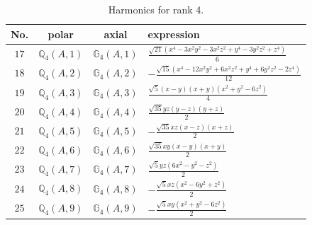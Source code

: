 \documentclass[fleqn,8pt,landscape]{jsarticle}
\begin{document}
\begin{table}[ht!]
\begin{center}
\caption{Harmonics for rank 4.}
\renewcommand{\arraystretch}{1.3}
\begin{tabular}{cccl} \hline \hline
No. & polar & axial & expression \\ \hline
$ 17 $ & $ \mathbb{Q}_{4}(A,1) $ & $ \mathbb{G}_{4}(A,1) $ & $ \frac{\sqrt{21} \left(x^{4} - 3 x^{2} y^{2} - 3 x^{2} z^{2} + y^{4} - 3 y^{2} z^{2} + z^{4}\right)}{6} $ \\
$ 18 $ & $ \mathbb{Q}_{4}(A,2) $ & $ \mathbb{G}_{4}(A,2) $ & $ - \frac{\sqrt{15} \left(x^{4} - 12 x^{2} y^{2} + 6 x^{2} z^{2} + y^{4} + 6 y^{2} z^{2} - 2 z^{4}\right)}{12} $ \\
$ 19 $ & $ \mathbb{Q}_{4}(A,3) $ & $ \mathbb{G}_{4}(A,3) $ & $ \frac{\sqrt{5} \left(x - y\right) \left(x + y\right) \left(x^{2} + y^{2} - 6 z^{2}\right)}{4} $ \\
$ 20 $ & $ \mathbb{Q}_{4}(A,4) $ & $ \mathbb{G}_{4}(A,4) $ & $ \frac{\sqrt{35} y z \left(y - z\right) \left(y + z\right)}{2} $ \\
$ 21 $ & $ \mathbb{Q}_{4}(A,5) $ & $ \mathbb{G}_{4}(A,5) $ & $ - \frac{\sqrt{35} x z \left(x - z\right) \left(x + z\right)}{2} $ \\
$ 22 $ & $ \mathbb{Q}_{4}(A,6) $ & $ \mathbb{G}_{4}(A,6) $ & $ \frac{\sqrt{35} x y \left(x - y\right) \left(x + y\right)}{2} $ \\
$ 23 $ & $ \mathbb{Q}_{4}(A,7) $ & $ \mathbb{G}_{4}(A,7) $ & $ \frac{\sqrt{5} y z \left(6 x^{2} - y^{2} - z^{2}\right)}{2} $ \\
$ 24 $ & $ \mathbb{Q}_{4}(A,8) $ & $ \mathbb{G}_{4}(A,8) $ & $ - \frac{\sqrt{5} x z \left(x^{2} - 6 y^{2} + z^{2}\right)}{2} $ \\
$ 25 $ & $ \mathbb{Q}_{4}(A,9) $ & $ \mathbb{G}_{4}(A,9) $ & $ - \frac{\sqrt{5} x y \left(x^{2} + y^{2} - 6 z^{2}\right)}{2} $ \\
 \hline \hline
\end{tabular}
\end{center}
\end{table}
\end{document}
